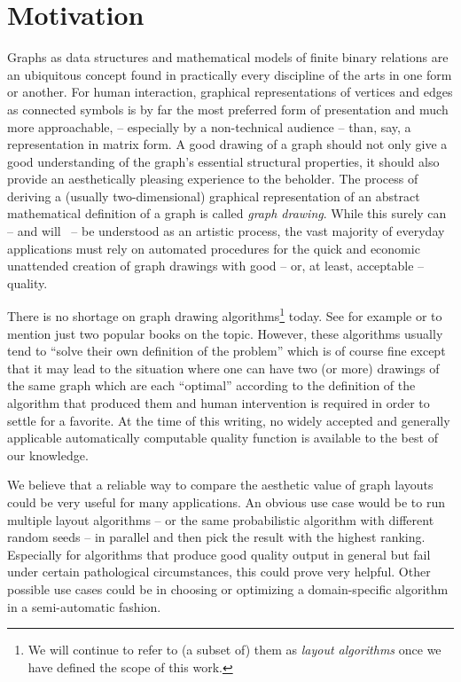 \documentclass{graphstudy}
\begin{document}
\section{Motivation}
\label{sec:motivation}

Graphs as data structures and mathematical models of finite binary relations are an ubiquitous concept found in
practically every discipline of the arts in one form or another.  For human interaction, graphical representations of
vertices and edges as connected symbols is by far the most preferred form of presentation and much more approachable, --
especially by a non-technical audience -- than, say, a representation in matrix form.  A good drawing of a graph should
not only give a good understanding of the graph's essential structural properties, it should also provide an
aesthetically pleasing experience to the beholder.  The process of deriving a (usually two-dimensional) graphical
representation of an abstract mathematical definition of a graph is called \emph{graph drawing}.  While this surely can
-- and will~\cite{Lombardi2003} -- be understood as an artistic process, the vast majority of everyday applications must
rely on automated procedures for the quick and economic unattended creation of graph drawings with good -- or, at least,
acceptable -- quality.

There is no shortage on graph drawing algorithms\footnote{%
  We will continue to refer to (a subset of) them as \emph{layout algorithms} once we have defined the scope of this
  work.
}
today.  See for example \textcite{Tollis1999} or \textcite{Tamassia2013} to mention just two popular books on the topic.
However, these algorithms usually tend to \enquote{solve their own definition of the problem} which is of course fine
except that it may lead to the situation where one can have two (or more) drawings of the same graph which are each
\enquote{optimal} according to the definition of the algorithm that produced them and human intervention is required in
order to settle for a favorite.  At the time of this writing, no widely accepted and generally applicable automatically
computable quality function is available to the best of our knowledge.

We believe that a reliable way to compare the aesthetic value of graph layouts could be very useful for many
applications.  An obvious use case would be to run multiple layout algorithms -- or the same probabilistic algorithm
with different random seeds -- in parallel and then pick the result with the highest ranking.  Especially for algorithms
that produce good quality output in general but fail under certain pathological circumstances, this could prove very
helpful.  Other possible use cases could be in choosing or optimizing a domain-specific algorithm in a semi-automatic
fashion.
\end{document}
